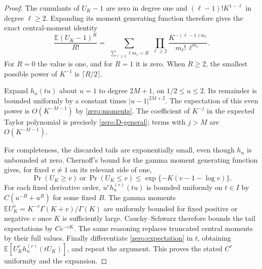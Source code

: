 \begin{proof}
The cumulants of $U_K-1$ are zero in degree one and
$(\ell-1)!K^{1-\ell}$ in degree $\ell\geq2$.  Expanding its moment
generating function therefore gives the exact central-moment identity
\begin{equation}\label{zero:moments}
 \frac{\mathbb E(U_K-1)^R}{R!}
 =\sum_{\substack{\sum_{\ell\geq2}\ell m_\ell=R}}
       \prod_{\ell\geq2}
       \frac{K^{-(\ell-1)m_\ell}}{m_\ell!\,\ell^{m_\ell}}.
\end{equation}
For $R=0$ the value is one, and for $R=1$ it is zero.
When $R\geq2$, the smallest possible power of $K^{-1}$ is
$\lceil R/2\rceil$.

Expand $h_n(tu)$ about $u=1$ to degree $2M+1$, on
$1/2\leq u\leq2$.  Its remainder is bounded uniformly by a constant
times $|u-1|^{2M+2}$.  The expectation of this even power is
$O(K^{-M-1})$ by \eqref{zero:moments}.  The coefficient of $K^{-j}$
in the expected Taylor polynomial is precisely
\eqref{zero:D-general}; terms with $j>M$ are $O(K^{-M-1})$.

For completeness, the discarded tails are exponentially small, even
though $h_n$ is unbounded at zero.  Chernoff's bound for the gamma
moment generating function gives, for fixed $v\ne1$ on its relevant
side of one,
\[
 \Pr(U_K\geq v)\ \text{or}\ \Pr(U_K\leq v)
       \leq \exp\{-K(v-1-\log v)\}.
\]
For each fixed derivative order, $u^r h_n^{(r)}(tu)$ is bounded
uniformly on $t\in I$ by $C(u^{-B}+u^B)$ for some fixed $B$.
The gamma moments
$\mathbb E U_K^v=K^{-v}\Gamma(K+v)/\Gamma(K)$ are uniformly bounded
for fixed positive or negative $v$ once $K$ is sufficiently large.
Cauchy--Schwarz therefore bounds the tail expectations by
$Ce^{-cK}$.  The same reasoning replaces truncated central moments
by their full values.  Finally differentiate
\eqref{zero:expectation} in $t$, obtaining
$\mathbb E[U_K^r h_n^{(r)}(tU_K)]$, and repeat the argument.
This proves the stated $C^r$ uniformity and the expansion.
\end{proof}

